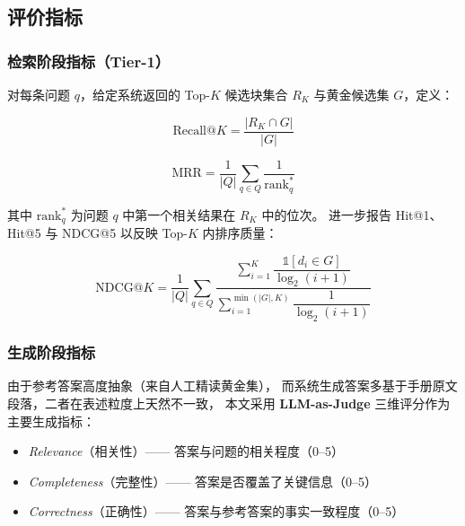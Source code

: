 \subsection{评价指标}
\label{sec:exp-metrics}

\subsubsection{检索阶段指标（Tier-1）}

对每条问题 $q$，给定系统返回的 Top-$K$ 候选块集合 $R_K$ 与黄金候选集 $G$，定义：

\begin{equation}
  \text{Recall@}K
  = \frac{|R_K \cap G|}{|G|}
  \label{eq:recall}
\end{equation}

\begin{equation}
  \text{MRR}
  = \frac{1}{|Q|} \sum_{q \in Q} \frac{1}{\mathrm{rank}_q^{*}}
  \label{eq:mrr}
\end{equation}

其中 $\mathrm{rank}_q^{*}$ 为问题 $q$ 中第一个相关结果在 $R_K$ 中的位次。
进一步报告 Hit@1、Hit@5 与 NDCG@5 以反映 Top-$K$ 内排序质量：

\begin{equation}
  \text{NDCG@}K
  = \frac{1}{|Q|}\sum_{q \in Q}
    \frac{\sum_{i=1}^{K}\dfrac{\mathbb{1}[d_i \in G]}{\log_2(i+1)}}
         {\sum_{i=1}^{\min(|G|,K)}\dfrac{1}{\log_2(i+1)}}
  \label{eq:ndcg}
\end{equation}

\subsubsection{生成阶段指标}

由于参考答案高度抽象（来自人工精读黄金集），
而系统生成答案多基于手册原文段落，二者在表述粒度上天然不一致，
本文采用 \textbf{LLM-as-Judge} 三维评分作为主要生成指标：

\begin{itemize}
  \item \textit{Relevance}（相关性）—— 答案与问题的相关程度（0--5）
  \item \textit{Completeness}（完整性）—— 答案是否覆盖了关键信息（0--5）
  \item \textit{Correctness}（正确性）—— 答案与参考答案的事实一致程度（0--5）
\end{itemize}

